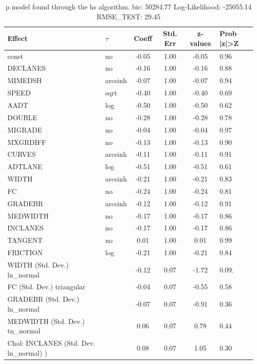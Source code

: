 \begin{table}
	\caption{p model found through the hs algorithm. bic: 50284.77 Log-Likelihood: -25055.14 RMSE_TEST: 29.45}
	\begin{center}
		\begin{tabular}{|l|l|c|c|c|l|}
			\hline
			Effect & $\tau$ & Coeff & Std. Err & z-values & Prob |z|>Z \\
			\hline
			const & no & -0.05 & 1.00 & -0.05 & 0.96 \\
			\hline
			DECLANES & no & -0.16 & 1.00 & -0.16 & 0.88 \\
			\hline
			MIMEDSH & arcsinh & -0.07 & 1.00 & -0.07 & 0.94 \\
			\hline
			SPEED & sqrt & -0.40 & 1.00 & -0.40 & 0.69 \\
			\hline
			AADT & log & -0.50 & 1.00 & -0.50 & 0.62 \\
			\hline
			DOUBLE & no & -0.28 & 1.00 & -0.28 & 0.78 \\
			\hline
			MIGRADE & no & -0.04 & 1.00 & -0.04 & 0.97 \\
			\hline
			MXGRDIFF & no & -0.13 & 1.00 & -0.13 & 0.90 \\
			\hline
			CURVES & arcsinh & -0.11 & 1.00 & -0.11 & 0.91 \\
			\hline
			ADTLANE & log & -0.51 & 1.00 & -0.51 & 0.61 \\
			\hline
			WIDTH & arcsinh & -0.21 & 1.00 & -0.21 & 0.83 \\
			\hline
			FC & no & -0.24 & 1.00 & -0.24 & 0.81 \\
			\hline
			GRADEBR & arcsinh & -0.12 & 1.00 & -0.12 & 0.91 \\
			\hline
			MEDWIDTH & no & -0.17 & 1.00 & -0.17 & 0.86 \\
			\hline
			INCLANES & no & -0.17 & 1.00 & -0.17 & 0.86 \\
			\hline
			TANGENT & no & 0.01 & 1.00 & 0.01 & 0.99 \\
			\hline
			FRICTION & log & -0.21 & 1.00 & -0.21 & 0.84 \\
			\hline
			WIDTH (Std. Dev.) ln_normal &  & -0.12 & 0.07 & -1.72 & 0.09. \\
			\hline
			FC (Std. Dev.) triangular &  & -0.04 & 0.07 & -0.55 & 0.58 \\
			\hline
			GRADEBR (Std. Dev.) ln_normal &  & -0.07 & 0.07 & -0.91 & 0.36 \\
			\hline
			MEDWIDTH (Std. Dev.) tn_normal &  & 0.06 & 0.07 & 0.78 & 0.44 \\
			\hline
			 Chol: INCLANES (Std. Dev. ln_normal) ) &  & 0.08 & 0.07 & 1.05 & 0.30 \\

\end{tabular}
\end{center}
\end{table}
